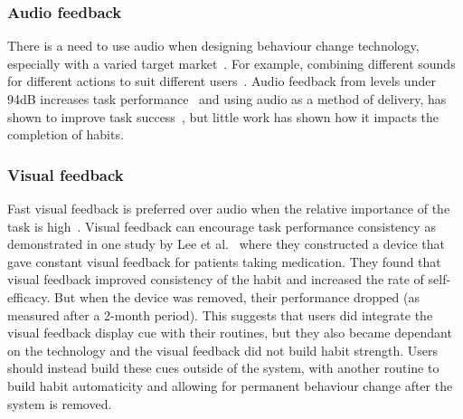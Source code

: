 \documentclass{scaffold/sigchi}
\begin{document}
\subsubsection{Audio feedback}
There is a need to use audio when designing behaviour change technology, especially with a varied target market~\cite{article_designing_for_health_behaviour_change_hci}. For example, combining different sounds for different actions to suit different users~\cite{article_movipill_improving_medication_elders}. Audio feedback from levels under 94dB increases task performance~\cite{high_audio_feedback_negative_performance} and using audio as a method of delivery, has shown to improve task success~\cite{audio_notifications_increase_delivery_success}, but little work has shown how it impacts the completion of habits.

\subsubsection{Visual feedback}
Fast visual feedback is preferred over audio when the relative importance of the task is high~\cite{visual_mode_better}. Visual feedback can encourage task performance consistency as demonstrated in one study by Lee et al.~\cite{article_realtime_feedback_improving_medication_taking} where they constructed a device that gave constant visual feedback for patients taking medication. They found that visual feedback improved consistency of the habit and increased the rate of self-efficacy. But when the device was removed, their performance dropped (as measured after a 2-month period). This suggests that users did integrate the visual feedback display cue with their routines, but they also became dependant on the technology and the visual feedback did not build habit strength. Users should instead build these cues outside of the system, with another routine to build habit automaticity and allowing for permanent behaviour change after the system is removed.
\end{document}
